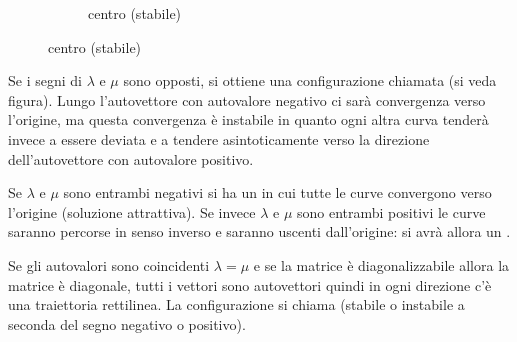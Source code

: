 \begin{figure}
\begin{subfigure}{5cm}
  \caption{centro (stabile)}
 \end{subfigure}
\end{figure}

Se i segni di $\lambda$ e $\mu$ sono opposti,
si ottiene una configurazione chiamata
 (si veda figura).
Lungo l'autovettore con autovalore negativo
ci sarà convergenza verso l'origine, ma questa
convergenza è instabile in quanto ogni altra
curva tenderà invece a essere deviata
e a tendere asintoticamente verso la direzione
dell'autovettore con autovalore positivo.

Se $\lambda$ e $\mu$ sono entrambi negativi si
ha un  in cui tutte le
curve convergono verso l'origine (soluzione
attrattiva). Se invece $\lambda$ e $\mu$
sono entrambi positivi le curve
saranno percorse in senso inverso e saranno
uscenti dall'origine: si avrà allora
un .

Se gli autovalori sono coincidenti $\lambda=\mu$
e se la matrice è diagonalizzabile allora
la matrice è diagonale, tutti i vettori sono
autovettori quindi in ogni direzione c'è
una traiettoria rettilinea.
La configurazione si
chiama  (stabile o instabile a seconda
del segno negativo o positivo).

